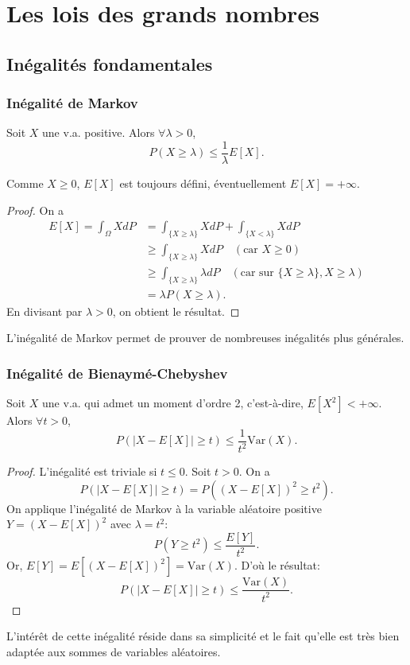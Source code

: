 \chapter{Les lois des grands nombres}
\sloppy


\section{Inégalités fondamentales}
\subsection{Inégalité de Markov}
\begin{proposition}
Soit $X$ une v.a. positive. Alors $\forall \lambda > 0$,
\[
P(X \ge \lambda) \le \frac{1}{\lambda} E[X].
\]
\end{proposition}
\begin{remark}
Comme $X \ge 0$, $E[X]$ est toujours défini, éventuellement $E[X] = +\infty$.
\end{remark}
\begin{proof}
On a
\begin{align*}
E[X] = \int_{\Omega} X dP &= \int_{\{X \ge \lambda\}} X dP + \int_{\{X < \lambda\}} X dP \\
&\ge \int_{\{X \ge \lambda\}} X dP \quad (\text{car } X \ge 0) \\
&\ge \int_{\{X \ge \lambda\}} \lambda dP \quad (\text{car sur } \{X \ge \lambda\}, X \ge \lambda) \\
&= \lambda P(X \ge \lambda).
\end{align*}
En divisant par $\lambda > 0$, on obtient le résultat.
\end{proof}
L'inégalité de Markov permet de prouver de nombreuses inégalités plus générales.
\subsection{Inégalité de Bienaymé-Chebyshev}
\begin{proposition}
Soit $X$ une v.a. qui admet un moment d'ordre 2, c'est-à-dire, $E[X^2] < +\infty$. Alors $\forall t > 0$,
\[
P(|X - E[X]| \ge t) \le \frac{1}{t^2} \text{Var}(X).
\]
\end{proposition}
\begin{proof}
L'inégalité est triviale si $t \le 0$. Soit $t>0$. On a
\[
P(|X - E[X]| \ge t) = P((X - E[X])^2 \ge t^2).
\]
On applique l'inégalité de Markov à la variable aléatoire positive $Y = (X - E[X])^2$ avec $\lambda = t^2$:
\[
P(Y \ge t^2) \le \frac{E[Y]}{t^2}.
\]
Or, $E[Y] = E[(X - E[X])^2] = \text{Var}(X)$. D'où le résultat:
\[
P(|X - E[X]| \ge t) \le \frac{\text{Var}(X)}{t^2}.
\]
\end{proof}
L'intérêt de cette inégalité réside dans sa simplicité et le fait qu'elle est très bien adaptée aux sommes de variables aléatoires.
